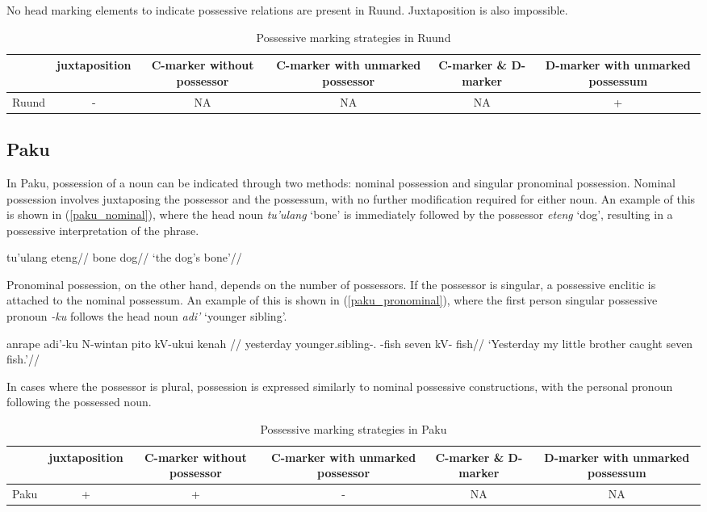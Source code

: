 No head marking elements to indicate possessive relations are present in Ruund. Juxtaposition is also impossible.

\begin{table}[h!]
	\centering
	\small
	\begin{tabular}{@{}cccccc@{}}
		\toprule
		& juxtaposition & \parbox{2.5cm}{C-marker without possessor} & \parbox{2.75cm}{C-marker with unmarked possessor} & \parbox{1.75cm}{C-marker \& D-marker} & \parbox{3cm}{D-marker with unmarked possessum} \\ \midrule
		Ruund & - & NA & NA & NA & + \\ \bottomrule
	\end{tabular}
	\caption{Possessive marking strategies in Ruund}
\end{table}

\subsection{Paku}

In Paku, possession of a noun can be indicated through two methods: nominal possession and singular pronominal possession. Nominal possession involves juxtaposing the possessor and the possessum, with no further modification required for either noun. An example of this is shown in (\ref{paku_nominal}), where the head noun \textit{tu'ulang} `bone' is immediately followed by the possessor \textit{eteng} `dog', resulting in a possessive interpretation of the phrase.

\ex
\label{paku_nominal}
\begingl
\gla tu'ulang eteng//
\glb bone dog//
\glft `the dog's bone'//
\endgl
\xe

Pronominal possession, on the other hand, depends on the number of possessors. If the possessor is singular, a possessive enclitic is attached to the nominal possessum. An example of this is shown in (\ref{paku_pronominal}), where the first person singular possessive pronoun \textit{-ku} follows the head noun \textit{adi'} `younger sibling'.

\ex
\label{paku_pronominal}
\begingl
\gla anrape adi'-ku N-wintan pito kV-ukui kenah //
\glb yesterday younger.sibling-\Fsg.\Poss{} \Av{}-fish seven kV- fish//
\glft `Yesterday my little brother caught seven fish.'//
\endgl
\xe

In cases where the possessor is plural, possession is expressed similarly to nominal possessive constructions, with the personal pronoun following the possessed noun.

\begin{table}[h!]
	\centering
	\small
	\begin{tabular}{@{}cccccc@{}}
		\toprule
		& juxtaposition & \parbox{2.5cm}{C-marker without possessor} & \parbox{2.75cm}{C-marker with unmarked possessor} & \parbox{1.75cm}{C-marker \& D-marker} & \parbox{3cm}{D-marker with unmarked possessum} \\ \midrule
		Paku & + & + & - & NA & NA \\ \bottomrule
	\end{tabular}
	\caption{Possessive marking strategies in Paku}
\end{table}


